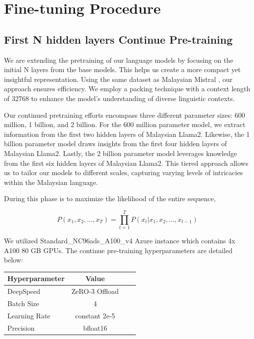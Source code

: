 \documentclass[preprint]{article}
\begin{document}
\section{Fine-tuning Procedure}

\subsection{First N hidden layers Continue Pre-training}\label{sec:n-layers}

We are extending the pretraining of our language models by focusing on the initial N layers from the base models. This helps us create a more compact yet insightful representation. Using the same dataset as Malaysian Mistral \cite{zolkepli2024large}, our approach ensures efficiency. We employ a packing technique with a context length of 32768 to enhance the model's understanding of diverse linguistic contexts.

Our continued pretraining efforts encompass three different parameter sizes: 600 million, 1 billion, and 2 billion. For the 600 million parameter model, we extract information from the first two hidden layers of Malaysian Llama2. Likewise, the 1 billion parameter model draws insights from the first four hidden layers of Malaysian Llama2. Lastly, the 2 billion parameter model leverages knowledge from the first six hidden layers of Malaysian Llama2. This tiered approach allows us to tailor our models to different scales, capturing varying levels of intricacies within the Malaysian language.

During this phase is to maximize the likelihood of the entire sequence,

\[
  P(x_1, x_2, \ldots, x_T) = \prod_{t=1}^{T} P(x_t | x_1, x_2, \ldots, x_{t-1})
\]

We utilized Standard\_NC96ads\_A100\_v4 Azure instance which contains 4x A100 80 GB GPUs. The continue pre-training hyperparameters are detailed below:

\begin{table}[h]
  \centering
  \begin{tabular}{lccl}
    \hline
    \textbf{Hyperparameter} & \textbf{Value} \\
    \hline
    DeepSpeed               & ZeRO-3 Offload \\
    Batch Size              & 4              \\
    Learning Rate           & constant 2e-5  \\
    Precision               & bfloat16       \\
    \hline
  \end{tabular}
\end{table}
\end{document}
